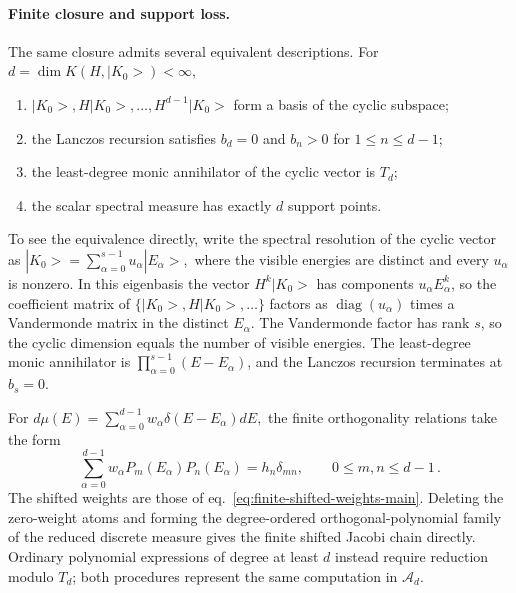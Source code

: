 \documentclass[a4paper,11pt]{article}
\def\ket#1{|#1>}%
\def\dd{d}%
\def\cK{K}%
\theoremstyle{definition}
\theoremstyle{remark}
\newcommand{\ket}[1]{|#1\rangle}
\newcommand{\dd}{\mathrm d}
\newcommand{\cK}{\mathcal K}
\newcommand{\cA}{\mathcal A}
\begin{document}
\paragraph{Finite closure and support loss.}
The same closure admits several equivalent descriptions. For $d=\dim\cK(H,\ket{K_0})<\infty$,
\begin{enumerate}[label=\emph{(\roman*)},leftmargin=2.2em,itemsep=4pt,topsep=4pt,parsep=0pt]
\item $\ket{K_0},H\ket{K_0},\ldots,H^{d-1}\ket{K_0}$ form a basis of the cyclic subspace;
\item the Lanczos recursion satisfies $b_d=0$ and $b_n>0$ for $1\le n\le d-1$;
\item the least-degree monic annihilator of the cyclic vector is $T_d$;
\item the scalar spectral measure has exactly $d$ support points.
\end{enumerate}
To see the equivalence directly, write the spectral resolution of the cyclic vector as
$
   \ket{K_0}=\sum_{\alpha=0}^{s-1}u_\alpha\ket{E_\alpha},
$
where the visible energies are distinct and every $u_\alpha$ is nonzero. %
In this eigenbasis the vector $H^k\ket{K_0}$ has components $u_\alpha E_\alpha^k$, so the
coefficient matrix of $\{\ket{K_0},H\ket{K_0},\ldots\}$ factors as
$\operatorname{diag}(u_\alpha)$ times a Vandermonde matrix in the distinct $E_\alpha$. The
Vandermonde factor has rank $s$, so the cyclic dimension equals the number of visible
energies. The least-degree monic annihilator is $\prod_{\alpha=0}^{s-1}(E-E_\alpha)$, and the Lanczos recursion terminates at $b_s=0$.

For
$
   \dd\mu(E)=\sum_{\alpha=0}^{d-1}w_\alpha
   \delta(E-E_\alpha)\dd E,
$
the finite orthogonality relations take the form
\begin{equation}
   \sum_{\alpha=0}^{d-1}w_\alpha
   P_m(E_\alpha)P_n(E_\alpha)
   =h_n\delta_{mn},
   \qquad 0\le m,n\le d-1\,.
\end{equation}
The shifted weights are those of eq.~\eqref{eq:finite-shifted-weights-main}.
Deleting the zero-weight atoms and forming the degree-ordered
orthogonal-polynomial family of the reduced discrete measure gives the
finite shifted Jacobi chain directly. Ordinary polynomial expressions of
degree at least $d$ instead require reduction modulo $T_d$; both procedures
represent the same computation in $\cA_d$.
\end{document}
